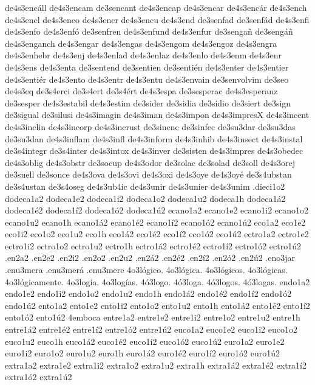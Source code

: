 {de4s3enc^^e1ll
de4s3encam
de3sencant
de4s3encap
de4s3encar
de4s3enc^^e1r
de4s3ench
de4s3encl
de4s3enco
de4s3encr
de4s3encu
de4s3end
de3senfad
de3senf^^e1d
de4s3enfi
de4s3enfo
de4s3enf^^f3
de3senfren
de4s3enfund
de4s3enfur
de3senga^^f1
de3seng^^e1^^f1
de4s3enganch
de4s3engar
de4s3engas
de4s3engom
de4s3engoz
de4s3engra
de4s3enhebr
de4s3enj
de4s3enlad
de4s3enlaz
de4s3enlo
de4s3enm
de4s3enr
de4s3ens
de4s3enta
de3sentend
de3sentien
de3senti^^e9n
de4s3enter
de4s3entier
de4s3enti^^e9r
de4s3ento
de4s3entr
de4s3entu
de4s3envain
de3senvolvim
de3seo
de4s3eq
de3s4erci
de3s4ert
de3s4^^e9rt
de4s3espa
de3sesperac
de4s3esperanz
de3sesper
de4s3estabil
de4s3estim
de3sider
de3sidia
de3sidio
de3siert
de3sign
de3sigual
de3silusi
de4s3imagin
de4s3iman
de4s3impon
de4s3impresX
de4s3incent
de4s3inclin
de4s3incorp
de4s3incrust
de3sinenc
de3sinfec
de3su3dar de3su3das de3su3dan
de4s3inflam
de4s3infl
de4s3inform
de4s3inhib
de4s3insect
de4s3instal
de3s4integr
de3s4inter
de4s3intox
de4s3inver
de3sisten
de4s3impres
de4s3obedec
de4s3oblig
de4s3obstr
de3socup
de4s3odor
de3solac
de3solad
de3soll
de4s3orej
de3suell
de3sonce
de4s3ova
de4s3ovi
de4s3oxi
de4s3oye
de4s3oy^^e9
de3s4ubstan
de3s4ustan
de3s4oseg
de4s3ub4ic
de4s3unir
de4s3unier
de4s3unim
.dieci1o2
dodeca1a2 dodeca1e2 dodeca1i2 dodeca1o2 dodeca1u2 dodeca1h
dodeca1^^e12 dodeca1^^e92 dodeca1^^ed2 dodeca1^^f32 dodeca1^^fa2
ecano1a2 ecano1e2 ecano1i2 ecano1o2 ecano1u2 ecano1h
ecano1^^e12 ecano1^^e92 ecano1^^ed2 ecano1^^f32 ecano1^^fa2
eco1a2 eco1e2 eco1i2 eco1o2 eco1u2 eco1h
eco1^^e12 eco1^^e92 eco1^^ed2 eco1^^f32 eco1^^fa2
ectro1a2 ectro1e2 ectro1i2 ectro1o2 ectro1u2 ectro1h
ectro1^^e12 ectro1^^e92 ectro1^^ed2 ectro1^^f32 ectro1^^fa2
.en2a2 .en2e2 .en2i2 .en2o2 .en2u2
.en2^^e12 .en2^^e92 .en2^^ed2 .en2^^f32 .en2^^fa2
.eno3jar
.enu3mera .enu3mer^^e1
.enu3mere
4o3l^^f3gico. 4o3l^^f3gica. 4o3l^^f3gicos. 4o3l^^f3gicas.
4o3l^^f3gicamente. 4o3log^^eda. 4o3log^^edas.
4^^f33logo. 4^^f33loga. 4^^f33logos. 4^^f33logas.
endo1a2 endo1e2 endo1i2 endo1o2 endo1u2 endo1h
endo1^^e12 endo1^^e92 endo1^^ed2 endo1^^f32 endo1^^fa2
ento1a2 ento1e2 ento1i2 ento1o2 ento1u2 ento1h
ento1^^e12 ento1^^e92 ento1^^ed2 ento1^^f32 ento1^^fa2
4emboca
entre1a2 entre1e2 entre1i2 entre1o2 entre1u2 entre1h
entre1^^e12 entre1^^e92 entre1^^ed2 entre1^^f32 entre1^^fa2
euco1a2 euco1e2 euco1i2 euco1o2 euco1u2 euco1h
euco1^^e12 euco1^^e92 euco1^^ed2 euco1^^f32 euco1^^fa2
euro1a2 euro1e2 euro1i2 euro1o2 euro1u2 euro1h
euro1^^e12 euro1^^e92 euro1^^ed2 euro1^^f32 euro1^^fa2
extra1a2 extra1e2 extra1i2 extra1o2 extra1u2 extra1h
extra1^^e12 extra1^^e92 extra1^^ed2 extra1^^f32 extra1^^fa2
}
